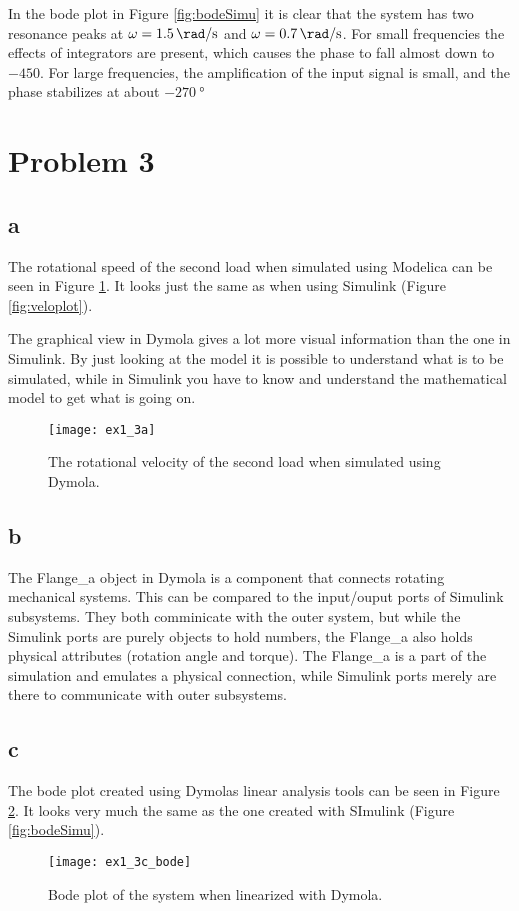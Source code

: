 \documentclass{article}
\begin{document}
In the bode plot in Figure \ref{fig:bodeSimu} it is clear that the system has two resonance peaks at $\omega = \SI[per-mode=fraction]{1.5}{\rad\per\second}$ and $\omega = \SI[per-mode=fraction]{0.7}{\rad\per\second}$. For small frequencies the effects of integrators are present, which causes the phase to fall almost down to $-450$. For large frequencies, the amplification of the input signal is small, and the phase stabilizes at about $\SI{-270}{\degree}$

\newpage

\section{Problem 3}

\subsection{a}

The rotational speed of the second load when simulated using Modelica can be seen in Figure \ref{fig:dymola1}. It looks just the same as when using Simulink (Figure \ref{fig:veloplot}).

The graphical view in Dymola gives a lot more visual information than the one in Simulink. By just looking at the model it is possible to understand what is to be simulated, while in Simulink you have to know and understand the mathematical model to get what is going on. 

\begin{figure}[h]
    \centering
    \texttt{[image: ex1\_3a]}
    \caption{The rotational velocity of the second load when simulated using Dymola.}
    \label{fig:dymola1} 
\end{figure}

\subsection{b}
The Flange\_a object in Dymola is a component that connects rotating mechanical systems. This can be compared to the input/ouput ports of Simulink subsystems. They both comminicate with the outer system, but while the Simulink ports are purely objects to hold numbers, the Flange\_a also holds physical attributes (rotation angle and torque). The Flange\_a is a part of the simulation and emulates a physical connection, while Simulink ports merely are there to communicate with outer subsystems. 


\subsection{c}

The bode plot created using Dymolas linear analysis tools can be seen in Figure \ref{fig:bodeDymola}. It looks very much the same as the one created with SImulink (Figure \ref{fig:bodeSimu}).

\begin{figure}[h]
    \centering
    \texttt{[image: ex1\_3c\_bode]}
    \caption{Bode plot of the system when linearized with Dymola.}
    \label{fig:bodeDymola} 
\end{figure}
\end{document}
